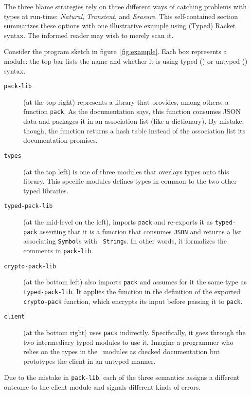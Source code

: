 
The three blame strategies rely on three different ways of catching problems
with types at run-time: {\em Natural\/}, {\em Transient\/}, and {\em
Erasure\/}. This self-contained section summarizes these options with one
illustrative example using (Typed) Racket syntax. The informed reader may wish to merely
scan it.

Consider the program sketch in figure~\ref{fig:example}. Each box represents a
module: the top bar lists the name and whether it is using typed (\typecolor) or
untyped (\dyncolor) syntax.
\begin{description}

\item[\texttt{pack-lib}] (at the top right) represents a library that provides,
among others, a function {\tt pack}. As the documentation says, this function
consumes JSON data and packages it in an association list (like a dictionary). By mistake, though, the
function returns a hash table instead of the association list its documentation
promises.

\item[\texttt{types}] (at the top left) is one of three modules that overlays
types onto this library. This specific modules defines types in common to the
two other typed libraries. 

\item[\texttt{typed-pack-lib}] (at the mid-level on the left), imports {\tt pack}
and re-exports it as \texttt{typed-pack} asserting that it is a function that
consumes {\tt JSON} and returns a list associating {\tt Symbol}s with {\tt
String}s. In other words, it formalizes the comments in {\tt pack-lib}.

\item[\texttt{crypto-pack-lib}] (at the bottom left) also imports \texttt{pack}
and assumes for it the same type as {\tt typed-pack-lib}. It applies the
function in the definition of the exported {\tt crypto-pack} function, which
encrypts its input before passing it to \texttt{pack}.

\item[\texttt{client}] (at the bottom right) uses {\tt pack}
indirectly. Specifically, it goes through the two intermediary typed modules to
use it. Imagine a programmer who relies on the types in the \typecolor\
modules as checked documentation but prototypes the client in an untyped manner.

\end{description}
Due to the mistake in {\tt pack-lib}, each of the three semantics assigns a
different outcome to the client module and signals different kinds of errors.

